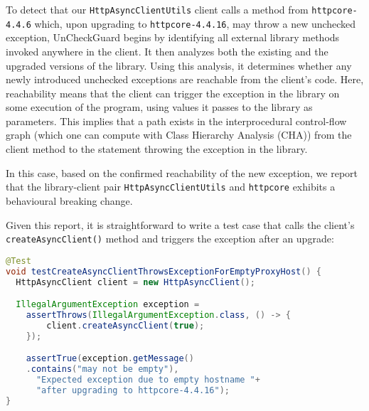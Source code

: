 To detect that our \texttt{HttpAsyncClientUtils} client calls a method from \texttt{httpcore-4.4.6} which, upon upgrading to \texttt{httpcore-4.4.16}, may throw a new unchecked exception, UnCheckGuard begins by identifying all external library methods invoked anywhere in the client. It then analyzes both the existing and the upgraded versions of the library. Using this analysis, it determines whether any newly introduced unchecked exceptions are reachable from the client's code. Here, reachability means
that the client can trigger the exception in the library on some execution of the program, using values it passes to the library as parameters.
This implies that a path exists in the interprocedural control-flow graph (which one can compute with Class Hierarchy Analysis (CHA)) from the client method to the statement throwing the exception in the library.

In this case, based on the confirmed reachability of the new exception, we report that the library-client pair \texttt{HttpAsyncClientUtils} and \texttt{httpcore} exhibits a behavioural breaking change.

Given this report, it is straightforward to write a test case that calls the client's \texttt{createAsyncClient()} method
and triggers the exception after an upgrade:
\begin{lstlisting}[language=Java,basicstyle=\scriptsize\ttfamily]
@Test
void testCreateAsyncClientThrowsExceptionForEmptyProxyHost() {
  HttpAsyncClient client = new HttpAsyncClient();

  IllegalArgumentException exception =
    assertThrows(IllegalArgumentException.class, () -> {
        client.createAsyncClient(true);
    });

    assertTrue(exception.getMessage()
    .contains("may not be empty"),
      "Expected exception due to empty hostname "+
      "after upgrading to httpcore-4.4.16");
}
\end{lstlisting}




